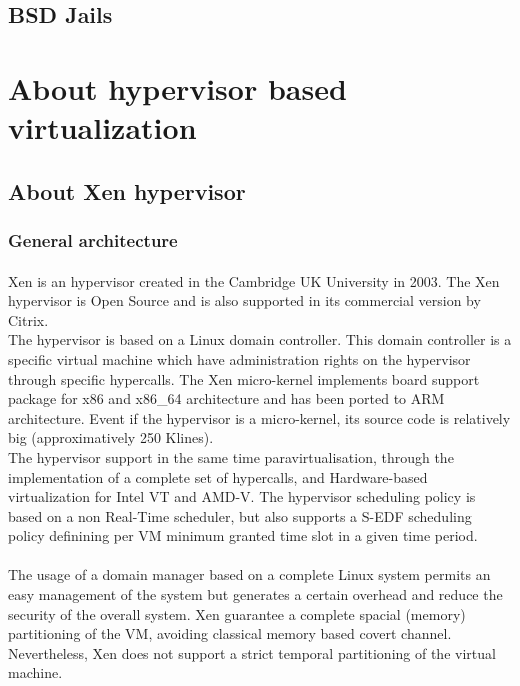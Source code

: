 \subsection{BSD Jails}

\section{About hypervisor based virtualization}

\subsection{About Xen hypervisor}

\subsubsection{General architecture}

\paragraph{}
Xen is an hypervisor created in the Cambridge UK University in 2003. The Xen hypervisor is Open
Source and is also supported in its commercial version by Citrix.\\
The hypervisor is based on a Linux domain controller. This domain controller is a specific virtual
machine which have administration rights on the hypervisor through specific hypercalls.
The Xen micro-kernel implements board support package for x86 and x86\_64 architecture and has been
ported to ARM architecture. Event if the hypervisor is a micro-kernel, its source code is
relatively big (approximatively 250 Klines).\\
The hypervisor support in the same time paravirtualisation, through the implementation of a
complete set of hypercalls, and Hardware-based virtualization for Intel VT and AMD-V.
The hypervisor scheduling policy is based on a non Real-Time scheduler, but also supports a S-EDF
scheduling policy definining per VM minimum granted time slot in a given time period.
\paragraph{}
The usage of a domain manager based on a complete Linux system permits an easy management of the
system but generates a certain overhead and reduce the security of the overall system.
Xen guarantee a complete spacial (memory) partitioning of the VM, avoiding classical memory based
covert channel. Nevertheless, Xen does not support a strict temporal partitioning of the virtual machine.

